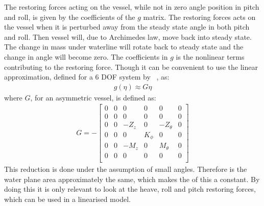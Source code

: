 The restoring forces acting on the vessel, while not in zero angle position in pitch and roll, is given by the coefficients of the $g$ matrix. The restoring forces acts on the vessel when it is perturbed away from the steady state angle in both pitch and roll. Then vessel will, due to Archimedes law, move back into steady state. The change in mass under waterline will rotate back to steady state and the change in angle will become zero. The coefficients in $g$ is the nonlinear terms contributing to the restoring force. Though it can be convenient to use the linear approximation, defined for a 6 \ac{DOF} system by ~\citep[eq. (4.22)(4.26)]{fossen}, as:
\begin{align}
g(\eta) \approx G\eta
\end{align}
where $G$, for an asymmetric vessel, is defined as:
\begin{align}
G = -
\begin{bmatrix}
0 & 0 & 0 & 0 & 0 & 0\\
0 & 0 & 0 & 0 & 0 & 0\\
0 & 0 & -Z_z & 0 & -Z_\theta & 0\\
0 & 0 & 0 & K_\phi & 0 & 0\\
0 & 0 & -M_z & 0 & M_\theta & 0\\
0 & 0 & 0 & 0 & 0 & 0\\
\end{bmatrix}
\end{align}
This reduction is done under the assumption of small angles. Therefore is the water plane area approximately the same, which makes the of this a constant. By doing this it is only relevant to look at the heave, roll and pitch restoring forces, which can be used in a linearised model.

